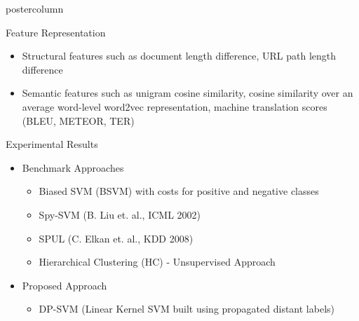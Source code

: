 \documentclass{beamer}
\begin{document}
\begin{frame}
\begin{columns}
\begin{column}{.5\textwidth}
\begin{beamercolorbox}[center]{postercolumn}
\begin{minipage}{.98\textwidth}
{%
  \begin{block}{Feature Representation}

	      \begin{itemize}
		\item Structural features such as document length difference, URL path length difference
	\vspace{0.5em}
		\item Semantic features such as unigram cosine similarity, cosine similarity over an average word-level word2vec representation, machine translation scores (BLEU, METEOR, TER)
		\end{itemize}	
    \end{block}
\vfill

                        \begin{block}{Experimental Results}
    \begin{itemize}
              \item Benchmark Approaches
                \begin{itemize}
                \item {\color{blue} Biased SVM (BSVM)} with costs for positive and negative classes
                \item {\color{brown} Spy-SVM} (B. Liu et. al., ICML 2002)
		\item {\color{cyan} SPUL} (C. Elkan et. al., KDD 2008)
                \item {\color{gray}Hierarchical Clustering (HC)} - Unsupervised Approach
              \end{itemize}
	      \item Proposed Approach
                \begin{itemize}
\item {\color{violet} DP-SVM} (Linear Kernel SVM built using propagated distant labels)
              \end{itemize}
     \end{itemize}
              \begin{figure}
                \footnotesize
                \centering


\end{figure}
\end{block}}
\end{minipage}
\end{beamercolorbox}
\end{column}
\end{columns}
\end{frame}
\end{document}
